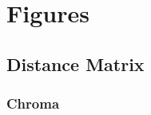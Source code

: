 \documentclass{article} %
\begin{document}



\clearpage
\appendix
\section{Figures}

\subsection{Distance Matrix}
\subsubsection{Chroma}




% 
\end{document}
